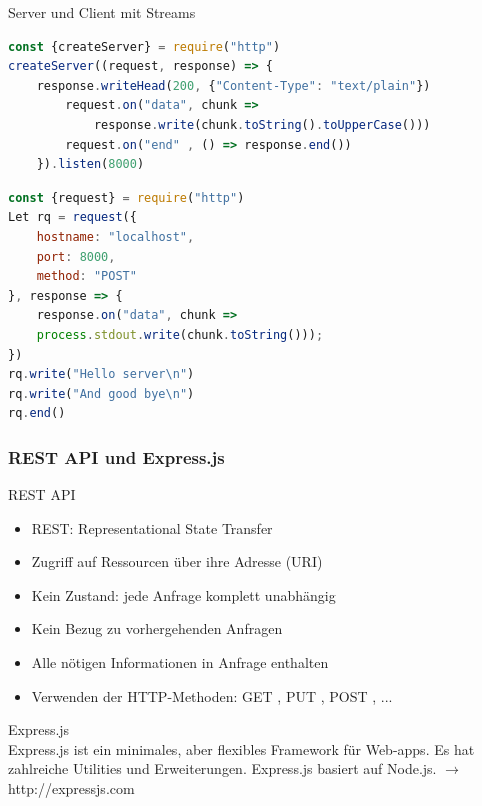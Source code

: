 \begin{examplecode}{Server und Client mit Streams}
\begin{lstlisting}[language=JavaScript, style=basesmol]
const {createServer} = require("http")
createServer((request, response) => {
    response.writeHead(200, {"Content-Type": "text/plain"})
        request.on("data", chunk =>
            response.write(chunk.toString().toUpperCase()))
        request.on("end" , () => response.end())
    }).listen(8000)
\end{lstlisting}

\begin{lstlisting}[language=JavaScript, style=basesmol]
const {request} = require("http")
Let rq = request({
    hostname: "localhost",
    port: 8000,
    method: "POST"
}, response => {
    response.on("data", chunk =>
    process.stdout.write(chunk.toString()));
})
rq.write("Hello server\n")
rq.write("And good bye\n")
rq.end()
\end{lstlisting}
\end{examplecode}

\columnbreak

\subsubsection{REST API und Express.js}

\begin{definition}{REST API}
\begin{itemize}
  \item REST: Representational State Transfer
  \item Zugriff auf Ressourcen über ihre Adresse (URI)
  \item Kein Zustand: jede Anfrage komplett unabhängig
  \item Kein Bezug zu vorhergehenden Anfragen
  \item Alle nötigen Informationen in Anfrage enthalten
  \item Verwenden der HTTP-Methoden: GET , PUT , POST , ...
\end{itemize}
\end{definition}

\begin{concept}{Express.js}\\
    Express.js ist ein minimales, aber flexibles Framework für Web-apps. Es hat zahlreiche Utilities und Erweiterungen. 
    Express.js basiert auf Node.js.
    $\rightarrow$ http://expressjs.com
\end{concept}


